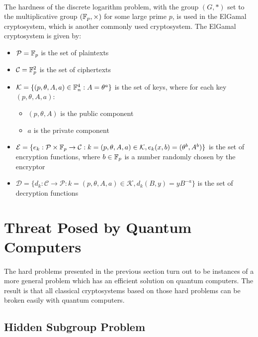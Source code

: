 \paragraph{}
The hardness of the discrete logarithm problem, with the group $(G, *)$ set to the multiplicative group $(\mathbb{F}_p, \times)$ for some large prime $p$, is used in the ElGamal cryptosystem, which is another commonly used cryptosystem. The ElGamal cryptosystem is given by:
\begin{itemize}
    \item $\mathcal{P} = \mathbb{F}_p$ is the set of plaintexts
    \item $\mathcal{C} = \mathbb{F}_p^2$ is the set of ciphertexts
    \item $\mathcal{K} = \{ (p, \theta, A, a) \in \mathbb{F}_n^4 : A = \theta^a \}$ is the set of keys, where for each key $(p, \theta, A, a)$:
    \begin{itemize}
        \item $(p, \theta, A)$ is the public component
        \item $a$ is the private component
    \end{itemize}
    \item $\mathcal{E} = \{ e_k: \mathcal{P} \times \mathbb{F}_p \rightarrow \mathcal{C} : k = (p, \theta, A, a) \in \mathcal{K}, e_k(x, b) = (\theta^b, A^b) \}$ is the set of encryption functions, where $b \in \mathbb{F}_p$ is a number randomly chosen by the encryptor
    \item $\mathcal{D} = \{ d_k: \mathcal{C} \rightarrow \mathcal{P} : k = (p, \theta, A, a) \in \mathcal{K}, d_k(B, y) = yB^{-a} \}$ is the set of decryption functions
\end{itemize}

\section{Threat Posed by Quantum Computers}
\paragraph{}
The hard problems presented in the previous section turn out to be instances of a more general problem which has an efficient solution on quantum computers. The result is that all classical cryptosystems based on those hard problems can be broken easily with quantum computers.

\subsection{Hidden Subgroup Problem}
